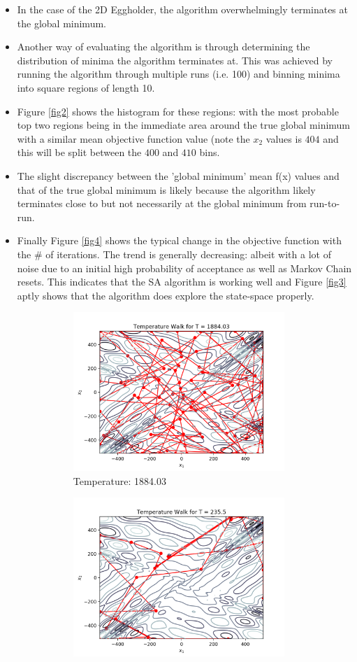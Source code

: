 \documentclass[12pt]{article}
\begin{document}
\begin{enumerate}
\begin{enumerate}
\begin{itemize}
		\item In the case of the 2D Eggholder, the algorithm overwhelmingly terminates at the global minimum.
		\item Another way of evaluating the algorithm is through determining the distribution of minima the algorithm terminates at. This was achieved by running the algorithm through multiple runs (i.e. 100) and binning minima into square regions of length 10. 
		\item Figure \ref{fig2} shows the histogram for these regions: with the most probable top two regions being in the immediate area around the true global minimum with a similar mean objective function value (note the $x_{2}$ values is $404$ and this will be split between the $400$ and $410$ bins. 
		\item The slight discrepancy between the 'global minimum' mean f(x) values and that of the true global minimum is likely because the algorithm likely terminates close to but not necessarily at the global minimum from run-to-run.
		\item Finally Figure \ref{fig4} shows the typical change in the objective function with the \# of iterations. The trend is generally decreasing: albeit with a lot of noise due to an initial high probability of acceptance as well as Markov Chain resets. This indicates that the SA algorithm is working well and Figure \ref{fig3} aptly shows that the algorithm does explore the state-space properly.
		\begin{figure}[ht]
		\centering
		\begin{subfigure}{8cm}
		\centering\includegraphics[width=8cm]{a_T_1}
		\caption{Temperature: 1884.03}
		\end{subfigure}%
		\begin{subfigure}{8cm}
		\centering\includegraphics[width=8cm]{a_T_2}

\end{subfigure}
\end{figure}
\end{itemize}
\end{enumerate}
\end{enumerate}
\end{document}
